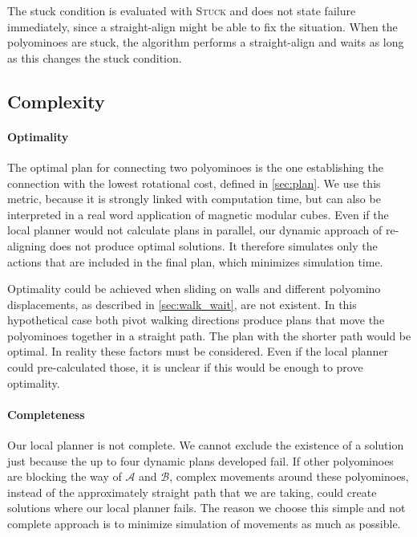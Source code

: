 The stuck condition is evaluated with {\scshape Stuck} and does not state failure immediately, since a straight-align might be able to fix the situation.
When the polyominoes are stuck, the algorithm performs a straight-align and waits as long as this changes the stuck condition.

\subsection{Complexity}
\label{sec:local_complex}

\paragraph{Optimality}

The optimal plan for connecting two polyominoes is the one establishing the connection with the lowest rotational cost, defined in \autoref{sec:plan}.
We use this metric, because it is strongly linked with computation time, but can also be interpreted in a real word application of magnetic modular cubes.
Even if the local planner would not calculate plans in parallel, our dynamic approach of re-aligning does not produce optimal solutions.
It therefore simulates only the actions that are included in the final plan, which minimizes simulation time.

Optimality could be achieved when sliding on walls and different polyomino displacements, as described in \autoref{sec:walk_wait}, are not existent.
In this hypothetical case both pivot walking directions produce plans that move the polyominoes together in a straight path.
The plan with the shorter path would be optimal.
In reality these factors must be considered.
Even if the local planner could pre-calculated those, it is unclear if this would be enough to prove optimality.

\paragraph{Completeness}

Our local planner is not complete.
We cannot exclude the existence of a solution just because the up to four dynamic plans developed fail.
If other polyominoes are blocking the way of $\mathcal{A}$ and $\mathcal{B}$, complex movements around these polyominoes, instead of the approximately straight path that we are taking, could create solutions where our local planner fails.
The reason we choose this simple and not complete approach is to minimize simulation of movements as much as possible. 




